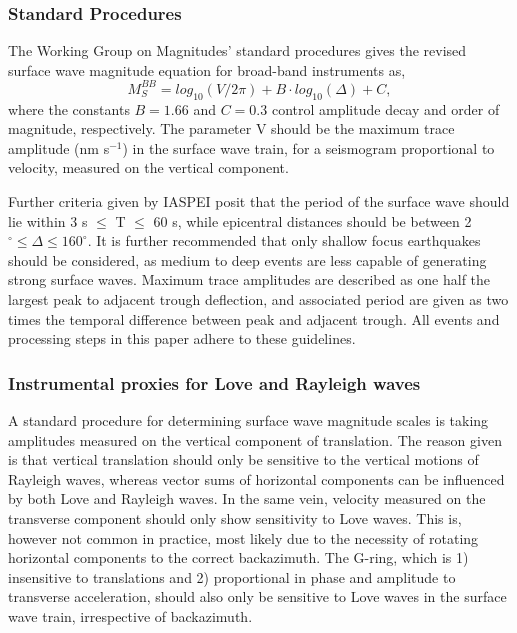\documentclass{gji}
\begin{document}
\subsubsection{Standard Procedures}\label{standproc}
The Working Group on Magnitudes' standard procedures gives the revised surface wave magnitude equation for broad-band instruments as,
\begin{equation}\label{eq:mag}
	M_S^{BB} = log_{10}(V/2\pi) + B\cdot log_{10}(\Delta) + C, 
\end{equation}
where the constants $B=1.66$ and $C=0.3$ control amplitude decay and order of magnitude, respectively. The parameter V should be the maximum trace amplitude (nm s$^{-1}$) in the surface wave train, for a seismogram proportional to velocity, measured on the vertical component. 

Further criteria given by IASPEI posit that the period of the surface wave should lie within 3 s $\le$ T $\le$ 60 s, while epicentral distances should be between 2$^\circ \le \Delta \le 160^\circ$. It is further recommended that only shallow focus earthquakes should be considered, as medium to deep events are less capable of generating strong surface waves. %
Maximum trace amplitudes are described as one half the largest peak to adjacent trough deflection, and associated period are given as two times the temporal difference between peak and adjacent trough. All events and processing steps in this paper adhere to these guidelines.

\subsubsection{Instrumental proxies for Love and Rayleigh waves}
A standard procedure for determining surface wave magnitude scales is taking amplitudes measured on the vertical component of translation. The reason given is that vertical translation should only be sensitive to the vertical motions of Rayleigh waves, whereas vector sums of horizontal components can be influenced by both Love and Rayleigh waves. In the same vein, velocity measured on the transverse component should only show sensitivity to Love waves. This is, however not common in practice, most likely due to the necessity of rotating horizontal components to the correct backazimuth. The G-ring, which is 1) insensitive to translations and 2) proportional in phase and amplitude to transverse acceleration, should also only be sensitive to Love waves in the surface wave train, irrespective of backazimuth.  
\end{document}
